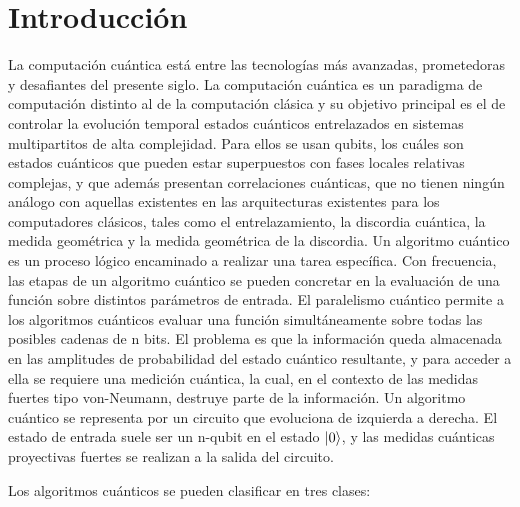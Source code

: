 \chapter{Introducci\'on}

La computación cuántica \cite{Hayashi_2015, Jones_2009, Nielsen_2009, Nakahara_2008} está entre las tecnologías más avanzadas, prometedoras y desafiantes del presente siglo. La computación cuántica es un paradigma de computación distinto al de la computación clásica y su objetivo principal es el de controlar la evolución temporal estados cuánticos entrelazados en sistemas multipartitos de alta complejidad. Para ellos se usan qubits, los cuáles son estados cuánticos que pueden estar superpuestos con fases locales relativas complejas, y que además presentan correlaciones cuánticas, que no tienen ningún análogo con aquellas existentes en las arquitecturas existentes para los computadores clásicos, tales como el entrelazamiento, la discordia cuántica, la medida geométrica y la medida geométrica de la discordia.  Un algoritmo cuántico es un proceso lógico encaminado a realizar una tarea específica. Con frecuencia, las etapas de un algoritmo cuántico se pueden concretar en la evaluación de una función sobre distintos parámetros de entrada. El paralelismo cuántico permite a los algoritmos cuánticos evaluar una función simultáneamente sobre todas las posibles cadenas de n bits. El problema es que la información queda almacenada en las amplitudes de probabilidad del estado cuántico resultante, y para acceder a ella se requiere una medición cuántica, la cual, en el contexto de las medidas fuertes tipo von-Neumann, destruye parte de la información. Un algoritmo cuántico se representa por un circuito que evoluciona de izquierda a derecha. El estado de entrada suele ser un n-qubit en el estado $\ket{0}$, y las medidas cuánticas proyectivas fuertes se realizan a la salida del circuito.

Los algoritmos cuánticos se pueden clasificar en tres clases:

